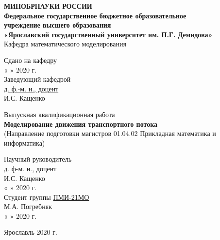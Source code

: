 \documentclass[12pt, a4paper]{extarticle}
\numberwithin{equation}{section}
\begin{document}
\thispagestyle{empty} 
\medskip 

\begin{center} 
	\textbf{МИНОБРНАУКИ РОССИИ\\ 
		\vspace{0.5cm} 
		Федеральное государственное бюджетное образовательное\\ 
		учреждение высшего образования\\ 
		«Ярославский государственный университет им. П.Г. Демидова»}\\ 
	\vspace{0.5cm} 
	{Кафедра математического моделирования}\\ 
	\vspace{1.5cm} 
	
\end{center}
\begin{flushright} 
	Сдано на кафедру\\
	« 
	\underline{\phantom{aaa}} 
	» 
	\underline{\phantom{aaaaaaaaaaaaa}} 2020 г.\\ 
	Заведующий кафедрой\\
	\underline{\phantom{aaa}д. ф.-м. н., доцент\phantom{aaa}}\\ 
	\vspace{0.1cm} 
	\underline{\phantom{aaaaaaaaaaaaa}} И.С. Кащенко
\end{flushright}
\vspace{3cm} 
\begin{center} 
	Выпускная квалификационная работа\\ 
	\vspace{0.5cm} 
	\textbf{Моделирование движения транспортного потока}\\ 
	\small{(Направление подготовки магистров 01.04.02 Прикладная математика и информатика)}
	\vspace{3cm} 
\end{center} 

\begin{flushright} 
	Научный руководитель\\ 
	\underline{\phantom{aaa}д. ф-м. н., доцент\phantom{aaa}}\\ 
	\vspace{0.1cm} 
	\underline{\phantom{aaaaaaaaaaaaa}} И.С. Кащенко\\ 
	« 
	\underline{\phantom{aaa}} 
	» 
	\underline{\phantom{aaaaaaaaaaaaa}} 2020 г.\\ 
	\vspace{0.5cm} 
	Студент группы \underline{\phantom{a}ПМИ-21МО\phantom{a}}\\ 
	\vspace{0.1cm} 
	\underline{\phantom{aaaaaaaaaaaaa}} М.А. Погребняк\\ 
	« 
	\underline{\phantom{aaa}} 
	» 
	\underline{\phantom{aaaaaaaaaaaaaa}}2020 г.\\ 
	\vspace{1cm} 
\end{flushright} 
\begin{center} 
	Ярославль 2020 г.
	\vspace{-1cm}  
\end{center} 
\end{document}
